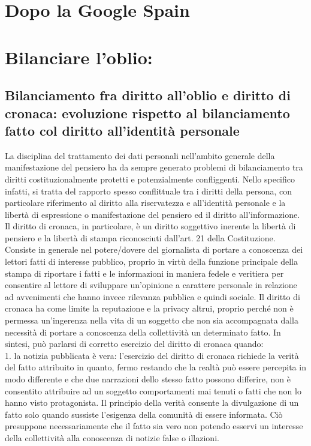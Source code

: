 
\section{Dopo la Google Spain}


\section{Bilanciare l'oblio:}
\subsection{Bilanciamento fra diritto all'oblio e diritto di cronaca: evoluzione rispetto al bilanciamento fatto col diritto all'identità personale}
La disciplina del trattamento dei dati personali nell'ambito generale della manifestazione del pensiero ha da sempre generato problemi di bilanciamento tra diritti costituzionalmente protetti e potenzialmente confliggenti.
Nello specifico infatti, si tratta del rapporto spesso conflittuale tra i diritti della persona, con particolare riferimento al diritto alla riservatezza e all'identità personale e la libertà di espressione o manifestazione del pensiero ed il diritto all'informazione. Il diritto di cronaca, in particolare, è un diritto soggettivo inerente la libertà di pensiero e la libertà di stampa riconosciuti dall'art. 21  della Costituzione. Consiste in generale nel potere/dovere del giornalista di portare a conoscenza dei lettori fatti di interesse pubblico, proprio in virtù della funzione principale della stampa di riportare i fatti e le informazioni in maniera fedele e veritiera per consentire al lettore di sviluppare un'opinione a carattere personale in relazione ad avvenimenti che hanno invece rilevanza pubblica e quindi sociale.
Il diritto di cronaca ha come limite la reputazione e la privacy altrui, proprio perché non è permessa un'ingerenza nella vita di un soggetto che non sia accompagnata dalla necessità di portare a conoscenza della collettività un determinato fatto.
In sintesi, può parlarsi di corretto esercizio del diritto di cronaca quando:
\\1. la notizia pubblicata è vera: l'esercizio del diritto di cronaca richiede la verità del fatto attribuito in quanto, fermo restando che la realtà può essere percepita in modo differente e che due narrazioni dello stesso fatto possono differire, non è consentito attribuire ad un soggetto comportamenti mai tenuti o fatti che non lo hanno visto protagonista.
Il principio della verità consente la divulgazione di un fatto solo quando sussiste l'esigenza della comunità di essere informata. Ciò presuppone necessariamente che il fatto sia vero non potendo esservi un interesse della collettività alla conoscenza di notizie false o illazioni.
